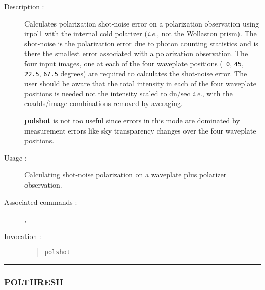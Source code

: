 \begin{description}

\item[Description :] Calculates polarization shot-noise error on a
polarization observation using {\sc irpol1} with the internal cold
polarizer (\emph{i.e.}, not the Wollaston prism).  The shot-noise is
the polarization error due to photon counting statistics and is there
the smallest error associated with a polarization observation.  The
four input images, one at each of the four waveplate positions ({\tt
0}, {\tt 45}, {\tt 22.5}, {\tt 67.5} degrees) are required to
calculates the shot-noise error.  The user should be aware that the
total intensity in each of the four waveplate positions is needed not
the intensity scaled to dn/sec \emph{i.e.}, with the coadds/image
combinations removed by averaging.

{\bf polshot} is not too useful since errors in this mode are dominated
by measurement errors like sky transparency changes over the four
waveplate positions.

\item[Usage :] Calculating shot-noise polarization on a waveplate plus
polarizer observation.

\item[Associated commands :] {\tt {}},
{\tt {}}

\item[Invocation :]

\begin{quote}{\tt  polshot }\end{quote}

\end{description}

\hrule
\subsubsection*{\label{POLTHRESH}POLTHRESH}

